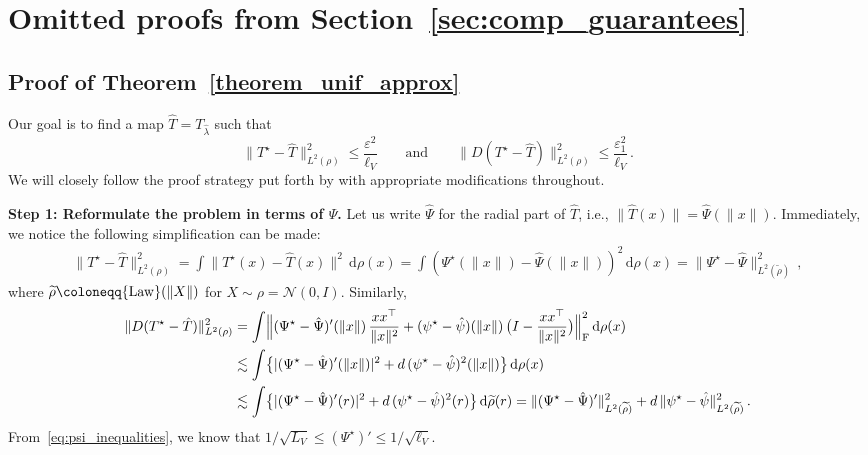 \documentclass[twoside]{article}
\newcommand{\cN}{\mathcal{N}}
\newcommand{\1}{\mathds{1}}
\renewcommand{\epsilon}{\varepsilon}
\newcommand*{\defeq}{\coloneqq}
\newcommand*{\rd}{\mathrm{d}}
\newcommand*{\dd}{\, \rd}
\theoremstyle{plain}
\theoremstyle{definition}
\theoremstyle{remark}
\renewcommand{\tilde}{\widetilde}
\begin{document}
\section{Omitted proofs from Section~\ref{sec:comp_guarantees}}\label{app:comp_guarantees}
\subsection{Proof of Theorem~\ref{theorem_unif_approx}}\label{app:unif_approx_proof}
Our goal is to find a map $\hat{T} = T_{\hat\lambda}$ such that
\begin{equation}\label{desired_bound}
    \|T^\star - \hat{T}\|_{L^{2}(\rho)}^2 \leq \frac{\epsilon^2}{\ell_V} \qquad \text{and} \qquad \|D(T^\star - \hat{T})\|_{L^{2}(\rho)}^2 \leq \frac{\epsilon_1^2}{\ell_V}\,.
\end{equation}
We will closely follow the proof strategy put forth by \cite{JiaChePoo24MFVI} with appropriate modifications throughout.

\textbf{Step 1: Reformulate the problem in terms of $\Psi$.}
Let us write $\hat\Psi$ for the radial part of $\hat T$, i.e., $\|\hat T(x)\| = \hat\Psi(\|x\|)$.
Immediately, we notice the following simplification can be made:
\begin{align*}
    \|T^\star - \hat{T}\|_{L^{2}(\rho)}^2 = \int \|T^\star(x) - \hat{T}(x)\|^2 \dd \rho(x)= \int (\Psi^\star(\|x\|) - \hat\Psi(\|x\|))^2\dd \rho(x)= \|\Psi^\star - \hat\Psi\|^2_{L^2(\tilde\rho)}\,,
\end{align*}
where $\tilde\rho \defeq {\rm{Law}}(\|X\|)$ for $X \sim \rho = \cN(0,I)$. 
Similarly,
\begin{align*}
    \|D(T^\star - \hat T)\|_{L^2(\rho)}^2
    &= \int \Bigl\lVert (\Psi^\star - \hat\Psi)'(\|x\|)\,\frac{xx^\top}{\|x\|^2} + (\psi^\star - \hat\psi)(\|x\|)\,\bigl(I - \frac{xx^\top}{\|x\|^2}\bigr)\Bigr\rVert_{\rm F}^2\dd \rho(x) \\
    &\lesssim \int \bigl\{ |(\Psi^\star - \hat\Psi)'(\|x\|)|^2 + d\,(\psi^\star - \hat\psi)^2(\|x\|) \bigr\}\dd \rho(x) \\
    &\lesssim \int \bigl\{ |(\Psi^\star - \hat\Psi)'(r)|^2 + d\,(\psi^\star - \hat\psi)^2(r) \bigr\}\dd \tilde\rho(r)
    = \|(\Psi^\star - \hat\Psi)'\|_{L^2(\tilde\rho)}^2 + d\,\|\psi^\star - \hat\psi\|_{L^2(\tilde\rho)}^2\,.
\end{align*}
From~\eqref{eq:psi_inequalities}, we know that $1/\sqrt{L_V} \le (\Psi^\star)' \le 1/\sqrt{\ell_V}$.
\end{document}
